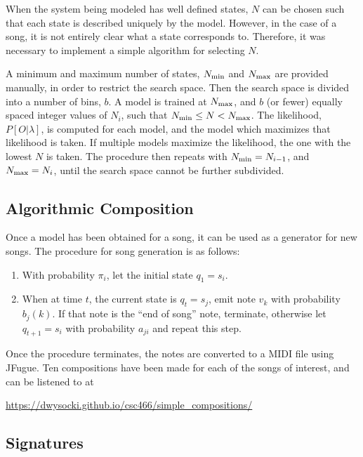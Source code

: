 \documentclass[12pt]{article}
\begin{document}
When the system being modeled has well defined states, $N$ can be chosen such
that each state is described uniquely by the model. However, in the case of a
song, it is not entirely clear what a state corresponds to. Therefore, it was
necessary to implement a simple algorithm for selecting $N$.

A minimum and maximum number of states, $N_{\rm min}$ and $N_{\rm max}$ are
provided manually, in order to restrict the search space. Then the search space
is divided into a number of bins, $b$. A model is trained at $N_{\rm max}$, and
$b$ (or fewer) equally spaced integer values of $N_i$, such that
$N_{\rm min} \leq N < N_{\rm max}$. The likelihood, $P[O|\lambda]$, is computed
for each model, and the model which maximizes that likelihood is taken. If
multiple models maximize the likelihood, the one with the lowest $N$ is
taken. The procedure then repeats with $N_{\rm min} = N_{i-1}$, and
$N_{\rm max} = N_i$, until the search space cannot be further subdivided.


\subsection{Algorithmic Composition} \label{sec:alg-comp}

Once a model has been obtained for a song, it can be used as a generator for
new songs. The procedure for song generation is as follows:

\begin{enumerate}
\item With probability $\pi_i$, let the initial state $q_1 = s_i$.

\item When at time $t$, the current state is $q_t = s_j$, emit note $v_k$ with
  probability $b_j(k)$. If that note is the ``end of song'' note, terminate,
  otherwise let $q_{t+1} = s_i$ with probability $a_{ji}$ and repeat this step.
\end{enumerate}

Once the procedure terminates, the notes are converted to a MIDI file using
JFugue. Ten compositions have been made for each of the songs of interest, and
can be listened to at

\url{https://dwysocki.github.io/csc466/simple_compositions/}




\subsection{Signatures} \label{sec:signatures}
\end{document}
